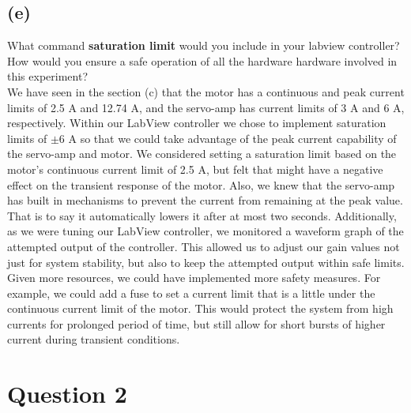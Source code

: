 \documentclass[letterpaper]{article}
\begin{document}
\subsection*{(e)}
What command \textbf{saturation limit} would you include in your labview controller? How would you ensure a safe operation of all the hardware hardware involved in this experiment?\\

We have seen in the section (c) that the motor has a continuous and peak current limits of 2.5 A and 12.74 A, and the servo-amp  has current limits of 3 A and 6 A, respectively. Within our LabView controller we chose to implement saturation limits of $\pm6$ A so that we could take advantage of the peak current capability of the servo-amp and motor. We considered setting a saturation limit based on the motor's continuous current limit of 2.5 A, but felt that might have a negative effect on the transient response of the motor. Also, we knew that the servo-amp has built in mechanisms to prevent the current from remaining at the peak value. That is to say it automatically lowers it after at most two seconds. Additionally, as we were tuning our LabView controller, we monitored a waveform graph of the attempted output of the controller. This allowed us to adjust our gain values not just for system stability, but also to keep the attempted output within safe limits. Given more resources, we could have implemented more safety measures. For example, we could add a fuse to set a current limit that is a little under the continuous current limit of the motor. This would protect the system from high currents for prolonged period of time, but still allow for short bursts of higher current during transient conditions.

\section*{Question 2}
\end{document}
